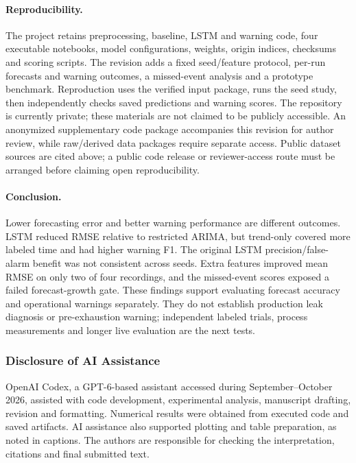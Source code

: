 \documentclass{llncs}
\begin{document}
\paragraph{Reproducibility.} The project retains preprocessing, baseline, LSTM and warning code, four executable notebooks, model configurations, weights, origin indices, checksums and scoring scripts. The revision adds a fixed seed/feature protocol, per-run forecasts and warning outcomes, a missed-event analysis and a prototype benchmark. Reproduction uses the verified input package, runs the seed study, then independently checks saved predictions and warning scores. The repository is currently private; these materials are not claimed to be publicly accessible. An anonymized supplementary code package accompanies this revision for author review, while raw/derived data packages require separate access. Public dataset sources are cited above; a public code release or reviewer-access route must be arranged before claiming open reproducibility.

\begin{samepage}
\paragraph{Conclusion.} Lower forecasting error and better warning performance are different outcomes. LSTM reduced RMSE relative to restricted ARIMA, but trend-only covered more labeled time and had higher warning F1. The original LSTM precision/false-alarm benefit was not consistent across seeds. Extra features improved mean RMSE on only two of four recordings, and the missed-event scores exposed a failed forecast-growth gate. These findings support evaluating forecast accuracy and operational warnings separately. They do not establish production leak diagnosis or pre-exhaustion warning; independent labeled trials, process measurements and longer live evaluation are the next tests.
\end{samepage}

\subsubsection{Disclosure of AI Assistance}
OpenAI Codex, a GPT-6-based assistant accessed during September--October 2026, assisted with code development, experimental analysis, manuscript drafting, revision and formatting. Numerical results were obtained from executed code and saved artifacts. AI assistance also supported plotting and table preparation, as noted in captions. The authors are responsible for checking the interpretation, citations and final submitted text.



\end{document}
